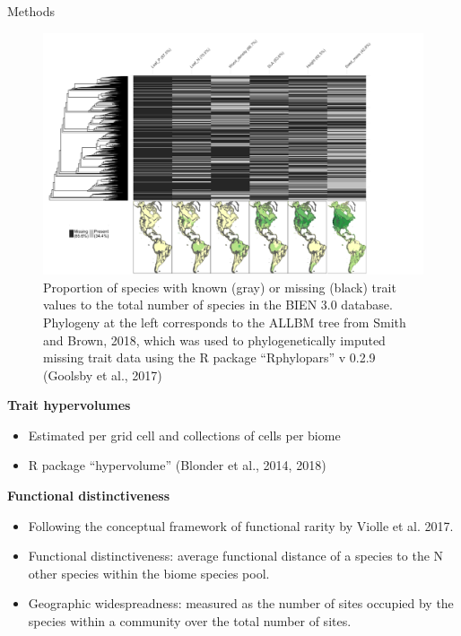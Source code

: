 \documentclass[final]{beamer}
\newlength{\onecolwid}
\begin{document}
\begin{frame}[t]
\begin{columns}[t]
\begin{column}{\onecolwid}
\begin{block}{Methods}
\begin{figure}[h]
	\centering
	\includegraphics[width=1.05\textwidth]{./figures/Trait_sampling}
	\caption{Proportion of species with known (gray) or missing (black) trait values to the total number of species in the BIEN 3.0 database. Phylogeny at the left corresponds to the ALLBM tree from Smith and Brown, 2018, which was used to phylogenetically imputed missing trait data using the R package ``Rphylopars'' v 0.2.9 (Goolsby et al., 2017)}
	\label{fig:sampling}
\end{figure}


\textbf{Trait hypervolumes}
\begin{itemize}
\item Estimated per grid cell and collections of cells per biome
\item R package ``hypervolume'' (Blonder et al., 2014, 2018)
\end{itemize}

\textbf{Functional distinctiveness}

\begin{itemize}
\item Following the conceptual framework of functional rarity by Violle et al. 2017.
\item Functional distinctiveness: average functional distance of a species to the N other species within the biome species pool.
\item Geographic widespreadness: measured as the number of sites occupied by the species within a community over the total number of sites. 
\end{itemize}



	\end{block}
	

\end{column}
\end{columns}
\end{frame}
\end{document}
